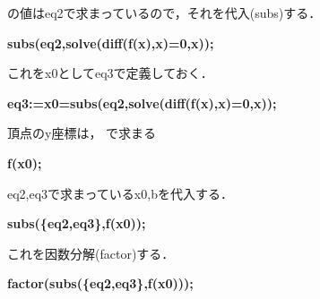 \documentclass{article}
\begin{document}
\begin{maplegroup}
\begin{Maple Normal}{
の値はeq2で求まっているので，それを代入(subs)する．}\end{Maple Normal}

\textbf{subs(eq2,solve(diff(f(x),x)=0,x));}\mapleresult
\begin{maplelatex}
\end{maplelatex}
\end{maplegroup}
\begin{maplegroup}
\begin{Maple Normal}{
これをx0としてeq3で定義しておく．}\end{Maple Normal}

\textbf{eq3:=x0=subs(eq2,solve(diff(f(x),x)=0,x));}\mapleresult
\begin{maplelatex}
\end{maplelatex}
\end{maplegroup}
\begin{maplegroup}
\begin{Maple Normal}{
頂点のy座標は，
で求まる}\end{Maple Normal}

\textbf{f(x0);}\mapleresult
\begin{maplelatex}
\end{maplelatex}
\end{maplegroup}
\begin{maplegroup}
\begin{Maple Normal}{
eq2,eq3で求まっているx0,bを代入する．}\end{Maple Normal}

\textbf{subs(\{eq2,eq3\},f(x0));}\mapleresult
\begin{maplelatex}
\end{maplelatex}
\end{maplegroup}
\begin{maplegroup}
\begin{Maple Normal}{
これを因数分解(factor)する．}\end{Maple Normal}

\textbf{factor(subs(\{eq2,eq3\},f(x0)));}\mapleresult
\begin{maplelatex}
\end{maplelatex}
\end{maplegroup}
\end{document}

